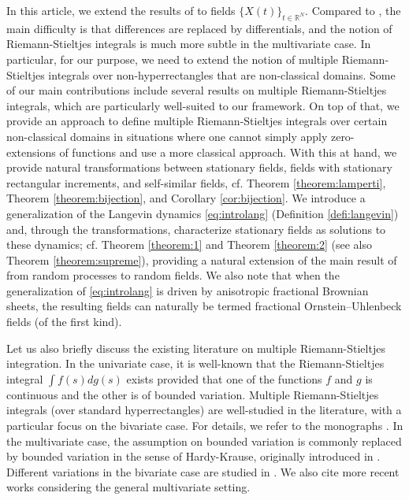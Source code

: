 \documentclass[english, a4paper, 12pt,reqno]{amsart}
\begin{document}
In this article, we extend the results of \cite{discrete} to fields $\{X(t)\}_{t\in \mathbb{R}^N}$. Compared to \cite{discrete}, the main difficulty is that differences are replaced by differentials, and the notion of Riemann-Stieltjes integrals is much more subtle in the multivariate case. In particular, for our purpose, we need to extend the notion of multiple Riemann-Stieltjes integrals over non-hyperrectangles that are non-classical domains. Some of our main contributions include several results on multiple Riemann-Stieltjes integrals, which are particularly well-suited to our framework. On top of that, we provide an approach to define multiple Riemann-Stieltjes integrals over certain non-classical domains in situations where one cannot simply apply zero-extensions of functions and use a more classical approach. With this at hand, we provide natural transformations between stationary fields, fields with stationary rectangular increments, and self-similar fields, cf. Theorem \ref{theorem:lamperti}, Theorem \ref{theorem:bijection}, and Corollary \ref{cor:bijection}. We introduce a generalization of the Langevin dynamics \eqref{eq:introlang} (Definition \ref{defi:langevin}) and, through the transformations, characterize stationary fields as solutions to these dynamics; cf. Theorem \ref{theorem:1} and Theorem \ref{theorem:2} (see also Theorem \ref{theorem:supreme}), providing a natural extension of the main result of \cite{Viitasaari-2016a} from random processes to random fields. We also note that when the generalization of \eqref{eq:introlang} is driven by anisotropic fractional Brownian sheets, the resulting fields can naturally be termed fractional Ornstein–Uhlenbeck fields (of the first kind).

Let us also briefly discuss the existing literature on multiple Riemann-Stieltjes integration. In the univariate case, it is well-known that the Riemann-Stieltjes integral $\int f(s)dg(s)$ exists provided that one of the functions $f$ and $g$ is continuous and the other is of bounded variation. Multiple Riemann-Stieltjes integrals (over standard hyperrectangles) are well-studied in the literature, with a particular focus on the bivariate case. For details, we refer to the monographs \cite{sard1963linear,hildebrandt1963introduction}. In the multivariate case, the assumption on bounded variation is commonly replaced by bounded variation in the sense of Hardy-Krause, originally introduced in \cite{hardy1906double}. Different variations in the bivariate case are studied in \cite{clarkson1933definitions}. We also cite more recent works \cite{owen2005multidimensional,prause2015sequential} considering the general multivariate setting.
\end{document}

